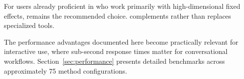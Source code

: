 For users already proficient in  who work primarily with
high-dimensional fixed effects,  remains the recommended choice.
 complements rather than replaces specialized tools.

The performance advantages documented here become practically relevant
for interactive use, where sub-second response times matter for
conversational workflows. Section~\ref{sec:performance} presents
detailed benchmarks across approximately 75 method configurations.


